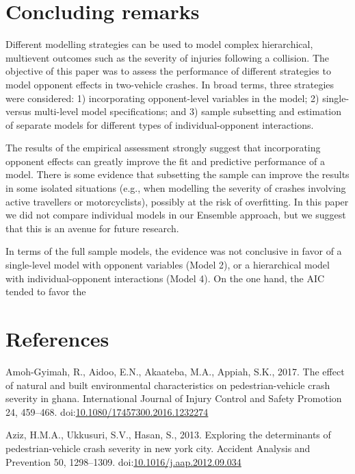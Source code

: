 \documentclass[]{elsarticle} %
\begin{document}
\hypertarget{sec:concluding-remarks}{%
\section{Concluding remarks}\label{sec:concluding-remarks}}

Different modelling strategies can be used to model complex
hierarchical, multievent outcomes such as the severity of injuries
following a collision. The objective of this paper was to assess the
performance of different strategies to model opponent effects in
two-vehicle crashes. In broad terms, three strategies were considered:
1) incorporating opponent-level variables in the model; 2) single-
versus multi-level model specifications; and 3) sample subsetting and
estimation of separate models for different types of individual-opponent
interactions.

The results of the empirical assessment strongly suggest that
incorporating opponent effects can greatly improve the fit and
predictive performance of a model. There is some evidence that
subsetting the sample can improve the results in some isolated
situations (e.g., when modelling the severity of crashes involving
active travellers or motorcyclists), possibly at the risk of
overfitting. In this paper we did not compare individual models in our
Ensemble approach, but we suggest that this is an avenue for future
research.

In terms of the full sample models, the evidence was not conclusive in
favor of a single-level model with opponent variables (Model 2), or a
hierarchical model with individual-opponent interactions (Model 4). On
the one hand, the AIC tended to favor the

\hypertarget{references}{%
\section*{References}\label{references}}

\hypertarget{refs}{}
\leavevmode\hypertarget{ref-Amoh2017effect}{}%
Amoh-Gyimah, R., Aidoo, E.N., Akaateba, M.A., Appiah, S.K., 2017. The
effect of natural and built environmental characteristics on
pedestrian-vehicle crash severity in ghana. International Journal of
Injury Control and Safety Promotion 24, 459--468.
doi:\href{https://doi.org/10.1080/17457300.2016.1232274}{10.1080/17457300.2016.1232274}

\leavevmode\hypertarget{ref-Aziz2013exploring}{}%
Aziz, H.M.A., Ukkusuri, S.V., Hasan, S., 2013. Exploring the
determinants of pedestrian-vehicle crash severity in new york city.
Accident Analysis and Prevention 50, 1298--1309.
doi:\href{https://doi.org/10.1016/j.aap.2012.09.034}{10.1016/j.aap.2012.09.034}
\end{document}
